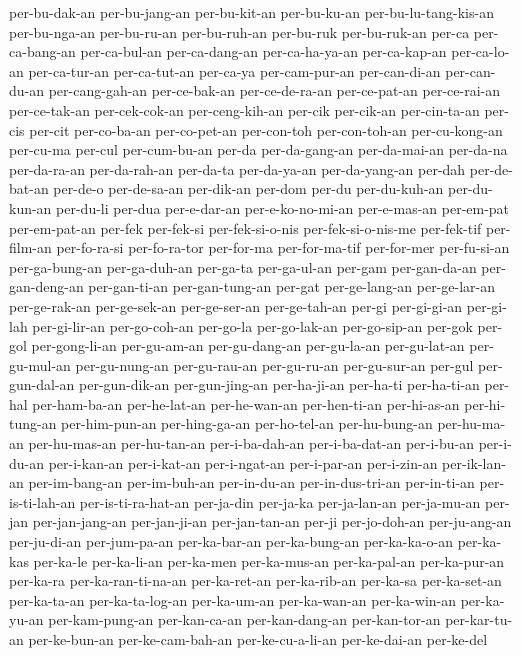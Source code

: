 {per-bu-dak-an per-bu-jang-an per-bu-kit-an per-bu-ku-an
per-bu-lu-tang-kis-an per-bu-nga-an per-bu-ru-an per-bu-ruh-an per-bu-ruk
per-bu-ruk-an per-ca per-ca-bang-an per-ca-bul-an per-ca-dang-an
per-ca-ha-ya-an per-ca-kap-an per-ca-lo-an per-ca-tur-an per-ca-tut-an
per-ca-ya per-cam-pur-an per-can-di-an per-can-du-an per-cang-gah-an
per-ce-bak-an per-ce-de-ra-an per-ce-pat-an per-ce-rai-an per-ce-tak-an
per-cek-cok-an per-ceng-kih-an per-cik per-cik-an per-cin-ta-an per-cis
per-cit per-co-ba-an per-co-pet-an per-con-toh per-con-toh-an
per-cu-kong-an per-cu-ma per-cul per-cum-bu-an per-da per-da-gang-an
per-da-mai-an per-da-na per-da-ra-an per-da-rah-an per-da-ta per-da-ya-an
per-da-yang-an per-dah per-de-bat-an per-de-o per-de-sa-an per-dik-an
per-dom per-du per-du-kuh-an per-du-kun-an per-du-li per-dua per-e-dar-an
per-e-ko-no-mi-an per-e-mas-an per-em-pat per-em-pat-an per-fek per-fek-si
per-fek-si-o-nis per-fek-si-o-nis-me per-fek-tif per-film-an per-fo-ra-si
per-fo-ra-tor per-for-ma per-for-ma-tif per-for-mer per-fu-si-an
per-ga-bung-an per-ga-duh-an per-ga-ta per-ga-ul-an per-gam per-gan-da-an
per-gan-deng-an per-gan-ti-an per-gan-tung-an per-gat per-ge-lang-an
per-ge-lar-an per-ge-rak-an per-ge-sek-an per-ge-ser-an per-ge-tah-an
per-gi per-gi-gi-an per-gi-lah per-gi-lir-an per-go-coh-an per-go-la
per-go-lak-an per-go-sip-an per-gok per-gol per-gong-li-an per-gu-am-an
per-gu-dang-an per-gu-la-an per-gu-lat-an per-gu-mul-an per-gu-nung-an
per-gu-rau-an per-gu-ru-an per-gu-sur-an per-gul per-gun-dal-an
per-gun-dik-an per-gun-jing-an per-ha-ji-an per-ha-ti per-ha-ti-an per-hal
per-ham-ba-an per-he-lat-an per-he-wan-an per-hen-ti-an per-hi-as-an
per-hi-tung-an per-him-pun-an per-hing-ga-an per-ho-tel-an per-hu-bung-an
per-hu-ma-an per-hu-mas-an per-hu-tan-an per-i-ba-dah-an per-i-ba-dat-an
per-i-bu-an per-i-du-an per-i-kan-an per-i-kat-an per-i-ngat-an
per-i-par-an per-i-zin-an per-ik-lan-an per-im-bang-an per-im-buh-an
per-in-du-an per-in-dus-tri-an per-in-ti-an per-is-ti-lah-an
per-is-ti-ra-hat-an per-ja-din per-ja-ka per-ja-lan-an per-ja-mu-an
per-jan per-jan-jang-an per-jan-ji-an per-jan-tan-an per-ji per-jo-doh-an
per-ju-ang-an per-ju-di-an per-jum-pa-an per-ka-bar-an per-ka-bung-an
per-ka-ka-o-an per-ka-kas per-ka-le per-ka-li-an per-ka-men per-ka-mus-an
per-ka-pal-an per-ka-pur-an per-ka-ra per-ka-ran-ti-na-an per-ka-ret-an
per-ka-rib-an per-ka-sa per-ka-set-an per-ka-ta-an per-ka-ta-log-an
per-ka-um-an per-ka-wan-an per-ka-win-an per-ka-yu-an per-kam-pung-an
per-kan-ca-an per-kan-dang-an per-kan-tor-an per-kar-tu-an per-ke-bun-an
per-ke-cam-bah-an per-ke-cu-a-li-an per-ke-dai-an per-ke-del
}
